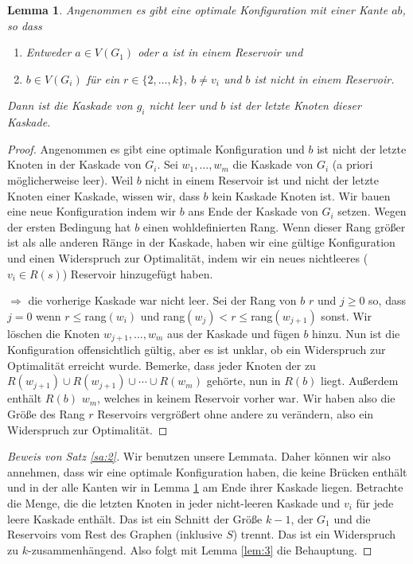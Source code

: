 \documentclass[12pt,a4paper]{scrartcl}
\numberwithin{equation}{section} %
\theoremstyle{definition}
\theoremstyle{plain}
\newtheorem{lem}[auf]{Lemma}
\begin{document}
\begin{lem}
\label{lem:4}
Angenommen es gibt eine optimale Konfiguration mit einer Kante $ab$, so dass 
\begin{enumerate}
\item Entweder $a\in V(G_1)$ oder $a$ ist in einem Reservoir und
\item $b\in V(G_i)$ für ein $r\in\lbrace 2,\dotsc,k\rbrace,~b\neq v_i$ und $b$ ist nicht in einem Reservoir.
\end{enumerate}
Dann ist die Kaskade von $g_i$ nicht leer und $b$ ist der letzte Knoten dieser Kaskade.
\end{lem}
\begin{proof}
Angenommen es gibt eine optimale Konfiguration und $b$ ist nicht der letzte Knoten in der Kaskade von $G_i$. Sei $w_1,\dotsc, w_m$ die Kaskade von $G_i$ (a priori möglicherweise leer). Weil $b$ nicht in einem Reservoir ist und nicht der letzte Knoten einer Kaskade, wissen wir, dass $b$ kein Kaskade Knoten ist. Wir bauen eine neue Konfiguration indem wir $b$ ans Ende der Kaskade von $G_i$ setzen. Wegen der ersten Bedingung hat $b$ einen wohldefinierten Rang. Wenn dieser Rang größer ist als alle anderen Ränge in der Kaskade, haben wir eine gültige Konfiguration und einen Widerspruch zur Optimalität, indem wir ein neues nichtleeres ($v_i\in R(s)$) Reservoir hinzugefügt haben. \par $\Rightarrow$ die vorherige Kaskade war nicht leer. Sei der Rang von $b$ $r$ und $j\ge 0$ so, dass $j=0$ wenn $r\le$rang$(w_i)$ und rang$(w_j)<r\le$rang$(w_{j+1})$ sonst. Wir löschen die Knoten $w_{j+1},\dotsc,w_m$ aus der Kaskade und fügen $b$ hinzu. Nun ist die Konfiguration offensichtlich gültig, aber es ist unklar, ob ein Widerspruch zur Optimalität erreicht wurde. Bemerke, dass jeder Knoten der zu $R(w_{j+1})\cup R(w_{j+1})\cup\dotsb\cup R(w_m)$ gehörte, nun in $R(b)$ liegt. Außerdem enthält $R(b)$ $w_m$, welches in keinem Reservoir vorher war. Wir haben also die Größe des Rang $r$ Reservoirs vergrößert ohne andere zu verändern, also ein Widerspruch zur Optimalität.
\end{proof}
\begin{proof}[Beweis von Satz \ref{sa:2}]
Wir benutzen unsere Lemmata. Daher können wir also annehmen, dass wir eine optimale Konfiguration haben, die keine Brücken enthält und in der alle Kanten wir in Lemma \ref{lem:4} am Ende ihrer Kaskade liegen. Betrachte die Menge, die die letzten Knoten in jeder nicht-leeren Kaskade und $v_i$ für jede leere Kaskade enthält. Das ist ein Schnitt der Größe $k-1$, der $G_1$ und die Reservoirs vom Rest des Graphen (inklusive $S$) trennt. Das ist ein Widerspruch zu $k$-zusammenhängend. Also folgt mit Lemma \ref{lem:3} die Behauptung.
\end{proof}
\end{document}
